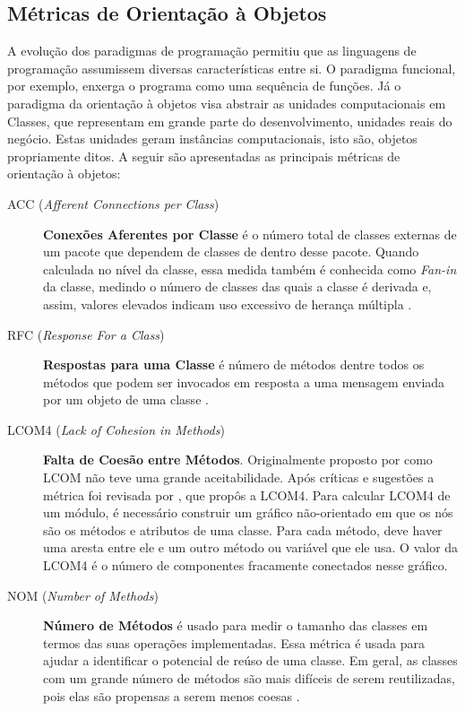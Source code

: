 \subsection{Métricas de Orientação à Objetos}
\label{métrica objetos}

A evolução dos paradigmas de programação permitiu que as linguagens de 
programação assumissem diversas características entre si. O paradigma 
funcional, por exemplo, enxerga o programa como uma sequência de funções. 
Já o paradigma da orientação à objetos visa abstrair as unidades computacionais em Classes, que representam em grande parte do desenvolvimento, unidades reais do negócio. Estas unidades geram instâncias computacionais, isto são, objetos propriamente ditos. A seguir são apresentadas 
as principais métricas de orientação à objetos:

\begin{description}

	\item[ACC (\textit{Afferent Connections per Class})] 
	\textbf{Conexões Aferentes por Classe} é o número total de classes externas 
	de um pacote que dependem de classes de dentro desse pacote. Quando 
	calculada no nível da classe, essa medida também é conhecida como 
	\textit{Fan-in} da classe, medindo o número de classes das quais a classe é 
	derivada e, assim, valores elevados indicam uso excessivo de herança 
	múltipla \cite{McCabe94} \cite{Chidamber94}.
	
	
	\item[RFC (\textit{Response For a Class})] \textbf{Respostas para uma 
	Classe} é número de métodos dentre todos os métodos que podem ser invocados 
	em resposta a uma mensagem enviada por um objeto de uma classe 
	\cite{Sharble93}.
	
	\item[LCOM4 (\textit{Lack of Cohesion in Methods})] \textbf{Falta de Coesão
	entre Métodos}. Originalmente proposto por  
	como LCOM não teve uma grande aceitabilidade. Após críticas e 
	sugestões a métrica foi revisada por , que propôs a LCOM4. 
	Para calcular LCOM4 de um módulo, é necessário construir um gráfico 
	não-orientado em que os nós são os métodos e atributos de uma classe. Para
	cada método, deve haver uma aresta entre ele e um outro método ou variável 
	que ele usa. O valor da LCOM4 é o número de componentes fracamente 
	conectados nesse gráfico. 

	
	\item[NOM (\textit{Number of Methods})] \textbf{Número de Métodos} é usado 
	para medir o tamanho das classes em termos das suas operações 
	implementadas. Essa métrica é usada para ajudar a identificar o 
	potencial de reúso de uma classe. Em geral, as classes com um grande 
	número de métodos são mais difíceis de serem reutilizadas, pois elas 
	são propensas a serem menos coesas \cite{Lorenz94}.
	


\end{description}
